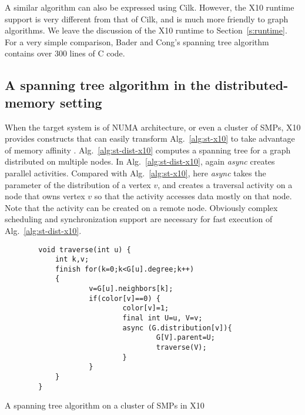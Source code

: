 A similar algorithm can also be expressed using Cilk. However, the X10 runtime support is very different from that of Cilk, and is much more friendly to graph algorithms. We leave the discussion of the X10 runtime to Section~\ref{s:runtime}. For a very simple comparison, Bader and Cong's spanning tree algorithm contains over 300 lines of C code.


\subsection{A spanning tree algorithm in the distributed-memory setting}
\label{s:trav-dist}

 When the target system is of NUMA architecture, or even a cluster of SMPs, X10 provides constructs that can easily transform Alg.~\ref{alg:st-x10} to take advantage of memory affinity . Alg.~\ref{alg:st-dist-x10} computes a spanning tree for a graph distributed on multiple nodes. In Alg.~\ref{alg:st-dist-x10}, again \emph{async} creates parallel activities. Compared with Alg.~\ref{alg:st-x10}, here \emph{async} takes the parameter of the distribution of a vertex $v$, and creates a traversal activity on a node that owns vertex $v$ so that the activity accesses data mostly on that node. Note that the activity can be created on a remote node. Obviously complex scheduling and synchronization support are necessary for fast execution of Alg.~\ref{alg:st-dist-x10}.
 
\begin{algorithm}
\begin{verbatim} 
        void traverse(int u) {
            int k,v;
            finish for(k=0;k<G[u].degree;k++)
            {
                    v=G[u].neighbors[k];
                    if(color[v]==0) {
                            color[v]=1;
                            final int U=u, V=v;
                            async (G.distribution[v]){
                                    G[V].parent=U;
                                    traverse(V);
                            }
                    }
            }
        }
\end{verbatim}
\caption{A spanning tree algorithm on a cluster of SMPs in X10}
\label{alg:st-dist-x10}
\end{algorithm}


